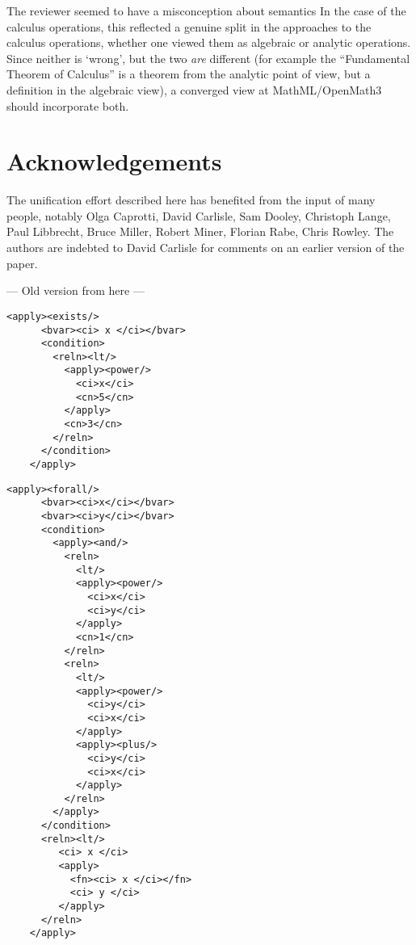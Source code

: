 \documentclass{llncs}
\begin{document}
\begin{newpart}{The reviewer seemed to have a misconception about semantics}
In the case of the calculus operations, this reflected a genuine split in the approaches
to the calculus operations, whether one viewed them as algebraic or analytic
operations. Since neither is `wrong', but the two {\emph{are}} different (for example the
``Fundamental Theorem of Calculus'' is a theorem from the analytic point of view, but a
definition in the algebraic view), a converged view at MathML/OpenMath3 should incorporate
both.

\section*{Acknowledgements}
The unification effort described here has benefited from the input of many people, notably
Olga Caprotti, David Carlisle, Sam Dooley, Christoph Lange, Paul Libbrecht, Bruce Miller,
Robert Miner, Florian Rabe, Chris Rowley. The authors are indebted to David Carlisle for
comments on an earlier version of the paper.

\vfill
\pagebreak
\iffull
\centerline{--- Old version from here ---}
\begin{lstlisting}[label=ex:exists,language=MathML2,
  caption={MathML-1 for ``there exists $x$ such that $x^5 < 3$''}]
    <apply><exists/>
      <bvar><ci> x </ci></bvar>
      <condition>
        <reln><lt/>
          <apply><power/>
            <ci>x</ci>
            <cn>5</cn>
          </apply>
          <cn>3</cn>
        </reln>
      </condition>
    </apply>
\end{lstlisting}

\begin{lstlisting}[label=ex:forall,language=MathML2, 
  caption={MathML-1 for ``for all $x$,$y$ such that $x^y < 1$ and $y^x < x + y$,$x < Q(y)$''}]
    <apply><forall/>
      <bvar><ci>x</ci></bvar>
      <bvar><ci>y</ci></bvar>
      <condition>
        <apply><and/>
          <reln>
            <lt/>
            <apply><power/>
              <ci>x</ci>
              <ci>y</ci>
            </apply>
            <cn>1</cn>
          </reln>
          <reln>
            <lt/>
            <apply><power/>
              <ci>y</ci>
              <ci>x</ci>
            </apply>
            <apply><plus/>
              <ci>y</ci>
              <ci>x</ci>
            </apply>
          </reln>
        </apply>
      </condition>
      <reln><lt/>
         <ci> x </ci>
         <apply>
           <fn><ci> x </ci></fn>
           <ci> y </ci>
         </apply>
      </reln>
    </apply>
\end{lstlisting}


\end{newpart}
\end{document}
